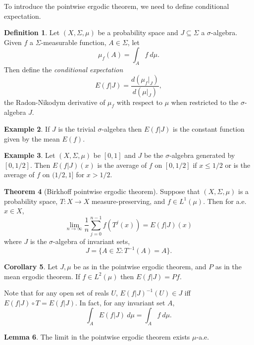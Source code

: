 \documentclass[12pt]{report}
\newcommand{\dfn}[1]{\emph{#1}\index{#1}}
\theoremstyle{definition}
\newtheorem{theorem}{Theorem}[chapter]
\newtheorem{lemma}[theorem]{Lemma}
\newtheorem{corollary}[theorem]{Corollary}
\newtheorem{definition}[theorem]{Definition}
\newtheorem{example}[theorem]{Example}
\begin{document}
To introduce the pointwise ergodic theorem, we need to define conditional expectation.
\begin{definition}
Let $(X, \Sigma, \mu)$ be a probability space and $J \subseteq \Sigma$ a $\sigma$-algebra. Given $f$ a $\Sigma$-measurable function, $A \in \Sigma$, let
$$\mu_f(A) = \int_A f~d\mu.$$
Then define the \dfn{conditional expectation}
$$E(f|J) = \frac{d(\mu_f|_J)}{d(\mu|_J)},$$
the Radon-Nikodym derivative of $\mu_f$ with respect to $\mu$ when restricted to the $\sigma$-algebra $J$.
\end{definition}
\begin{example}
If $J$ is the trivial $\sigma$-algebra then $E(f|J)$ is the constant function given by the mean $E(f)$.
\end{example}
\begin{example}
Let $(X, \Sigma, \mu)$ be $[0, 1]$ and $J$ be the $\sigma$-algebra generated by $[0, 1/2]$. Then $E(f|J)(x)$ is the average of $f$ on $[0, 1/2]$ if $x \leq 1/2$ or is the average of $f$ on $(1/2, 1]$ for $x > 1/2$.
\end{example}
\begin{theorem}[Birkhoff pointwise ergodic theorem]
Suppose that $(X, \Sigma, \mu)$ is a probability space, $T: X \to X$ measure-preserving, and $f \in L^1(\mu)$. Then for a.e. $x\in X$,
$$\lim_{n \to \infty} \frac{1}{n} \sum_{j=0}^{n-1} f(T^j(x)) = E(f|J)(x)$$
where $J$ is the $\sigma$-algebra of invariant sets,
$$J = \{A \in \Sigma: T^{-1}(A) = A\}.$$
\end{theorem}
\begin{corollary}
Let $J,\mu$ be as in the pointwise ergodic theorem, and $P$ as in the mean ergodic theorem. If $f \in L^2(\mu)$ then $E(f|J) = Pf$.
\end{corollary}
Note that for any open set of reals $U$, $E(f|J)^{-1}(U) \in J$ iff $E(f|J) \circ T = E(f|J)$. In fact, for any invariant set $A$,
$$\int_A E(f|J) ~d\mu = \int_A f~d\mu.$$
\begin{lemma}
The limit in the pointwise ergodic theorem exists $\mu$-a.e.
\end{lemma}
\end{document}

